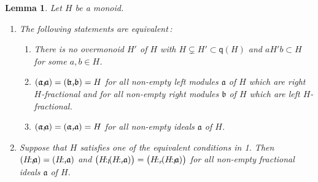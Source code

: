 \documentclass[a4paper]{amsart}
\newtheorem{lemma}[theorem]{Lemma}
\theoremstyle{definition}
\numberwithin{equation}{section}
\begin{document}
\medskip
\begin{lemma} \label{3.10}
Let $H$ be a monoid.
\begin{enumerate}
\item The following statements are equivalent{\rm \,:}
      \begin{enumerate}
      \smallskip
      \item[(a)] There is no overmonoid $H'$ of $H$ with $H \subsetneq H' \subset
           \mathsf q (H)$ and $a H' b \subset H$ for some $a, b \in H$.

      \smallskip
      \item[(b)] $(\mathfrak a {\negthinspace :_l \negthinspace} \mathfrak a) = (\mathfrak b {\negthinspace :_r \negthinspace} \mathfrak b) = H$
                 for all non-empty  left modules $\mathfrak a$ of $H$ which are right $H$-fractional and
                 for all non-empty right modules $\mathfrak b$ of $H$ which are left $H$-fractional.

      \smallskip
      \item[(c)] $(\mathfrak a {\negthinspace :_l \negthinspace} \mathfrak a) = (\mathfrak a {\negthinspace :_r \negthinspace} \mathfrak a) = H$ for all non-empty   ideals $\mathfrak a$ of $H$.
      \end{enumerate}

\smallskip
\item Suppose that  $H$ satisfies one of the equivalent conditions in
      1. Then  $(H {\negthinspace :_l \negthinspace} \mathfrak a) = (H {\negthinspace :_r \negthinspace} \mathfrak a)$ and $\big( H {\negthinspace :_l \negthinspace} (H {\negthinspace :_r \negthinspace} \mathfrak a)\big) = \big( H {\negthinspace :_r \negthinspace} (H {\negthinspace :_l \negthinspace}
      \mathfrak a)\big)$ for all non-empty fractional ideals $\mathfrak a$ of $H$.
\end{enumerate}
\end{lemma}
\end{document}
